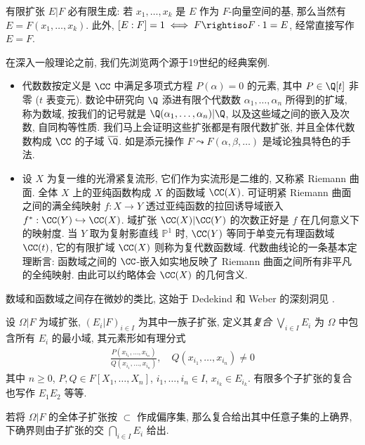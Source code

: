 有限扩张 $E|F$ 必有限生成: 若 $x_1, \ldots, x_k$ 是 $E$ 作为 $F$-向量空间的基, 那么当然有 $E=F(x_1, \ldots, x_k)$. 此外, $[E:F]=1 \iff F \rightiso F \cdot 1 = E$, 经常直接写作 $E=F$.

\begin{example}\label{eg:field-basic-examples}
	在深入一般理论之前, 我们先浏览两个源于19世纪的经典案例.
	\begin{itemize}
		\item 代数数按定义是 $\CC$ 中满足多项式方程 $P(\alpha)=0$ 的元素, 其中 $P \in \Q[t]$ 非零 ($t$ 表变元). 数论中研究向 $\Q$ 添进有限个代数数 $\alpha_1, \ldots, \alpha_n$ 所得到的扩域, 称为数域, 按我们的记号就是 $\Q(\alpha_1, \ldots, \alpha_n)|\Q$, 以及这些域之间的嵌入及次数, 自同构等性质. 我们马上会证明这些扩张都是有限代数扩张, 并且全体代数数构成 $\CC$ 的子域 $\overline{\Q}$. 如是添元操作 $F \leadsto F(\alpha, \beta, \ldots)$ 是域论独具特色的手法.
		\item 设 $X$ 为复一维的光滑紧复流形, 它们作为实流形是二维的, 又称紧 Riemann 曲面. 全体 $X$ 上的亚纯函数构成 $X$ 的函数域 $\CC(X)$. 可证明紧 Riemann 曲面之间的满全纯映射 $f: X \to Y$ 透过亚纯函数的拉回诱导域嵌入 $f^*: \CC(Y) \hookrightarrow \CC(X)$. 域扩张 $\CC(X)|\CC(Y)$ 的次数正好是 $f$ 在几何意义下的映射度. 当 $Y$ 取为复射影直线 $\mathbb{P}^1$ 时, $\CC(Y)$ 等同于单变元有理函数域 $\CC(t)$, 它的有限扩域 $\CC(X)$ 则称为复代数函数域. 代数曲线论的一条基本定理断言: 函数域之间的 $\CC$-嵌入如实地反映了 Riemann 曲面之间所有非平凡的全纯映射. 由此可以约略体会 $\CC(X)$ 的几何含义.
	\end{itemize}
	数域和函数域之间存在微妙的类比, 这始于 Dedekind 和 Weber 的深刻洞见 \cite{DW82}.
\end{example}

\begin{definition}
	设 $\Omega|F$ 为域扩张, $(E_i|F)_{i \in I}$ 为其中一族子扩张, 定义其\emph{复合} $\bigvee_{i \in I} E_i$ 为 $\Omega$ 中包含所有 $E_i$ 的最小域, 其元素形如有理分式
	\begin{gather}\label{eqn:fields-compositum}
		\frac{P(x_{i_1}, \ldots, x_{i_n})}{Q(x_{i_1}, \ldots, x_{i_n})}, \quad Q(x_{i_1}, \ldots, x_{i_n}) \neq 0
	\end{gather}
	其中 $n \geq 0$, $P, Q \in F[X_1, \ldots, X_n]$, $i_1, \ldots, i_n \in I$, $x_{i_k} \in E_{i_k}$. 有限多个子扩张的复合也写作 $E_1 E_2$ 等等.
\end{definition}
若将 $\Omega|F$ 的全体子扩张按 $\subset$ 作成偏序集, 那么复合给出其中任意子集的上确界, 下确界则由子扩张的交 $\bigcap_{i \in I} E_i$ 给出.

